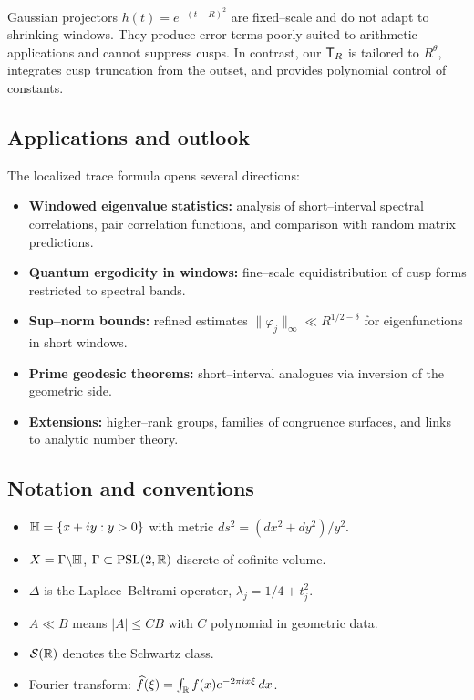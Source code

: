 Gaussian projectors $h(t)=e^{-(t-R)^2}$ are fixed–scale and do not adapt to shrinking
windows. They produce error terms poorly suited to arithmetic applications and cannot
suppress cusps. In contrast, our $\mathsf{T}_R$ is tailored to $R^\theta$, integrates cusp
truncation from the outset, and provides polynomial control of constants.

\subsection{Applications and outlook}\label{subsec:applications}

The localized trace formula opens several directions:

\begin{itemize}
  \item \textbf{Windowed eigenvalue statistics:} analysis of short–interval spectral
        correlations, pair correlation functions, and comparison with random matrix
        predictions.
  \item \textbf{Quantum ergodicity in windows:} fine–scale equidistribution of cusp forms
        restricted to spectral bands.
  \item \textbf{Sup–norm bounds:} refined estimates $\|\varphi_j\|_\infty\ll R^{1/2-\delta}$
        for eigenfunctions in short windows.
  \item \textbf{Prime geodesic theorems:} short–interval analogues via inversion of the
        geometric side.
  \item \textbf{Extensions:} higher–rank groups, families of congruence surfaces, and
        links to analytic number theory.
\end{itemize}

\subsection{Notation and conventions}\label{subsec:notation}

\begin{itemize}
  \item $\mathbb{H}=\{x+iy:y>0\}$ with metric $ds^2=(dx^2+dy^2)/y^2$.
  \item $X=\Gamma\backslash\mathbb{H}$, $\Gamma\subset\mathrm{PSL}(2,\mathbb{R})$ discrete of cofinite volume.
  \item $\Delta$ is the Laplace–Beltrami operator, $\lambda_j=1/4+t_j^2$.
  \item $A\ll B$ means $|A|\le CB$ with $C$ polynomial in geometric data.
  \item $\mathcal{S}(\mathbb{R})$ denotes the Schwartz class.
  \item Fourier transform: $\widehat{f}(\xi)=\int_{\mathbb{R}} f(x)e^{-2\pi i x\xi}\,dx$.
\end{itemize}

